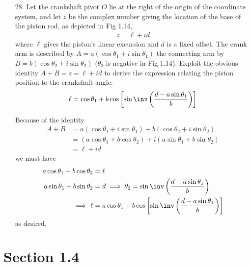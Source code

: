 \documentclass{article}
\begin{document}
\begin{itemize}
	\item[28.] Let the crankshaft pivot $O$ lie at the right of the origin of the coordinate system, and let $z$ be the complex number giving the location of the base of the piston rod, as depicted in Fig 1.14,
		\begin{align*}
			z=\ell+id
		\end{align*}
		where $\ell$ gives the piston's linear excursion and $d$ is a fixed offset. The crank arm is described by $A=a(\cos \theta_1+i\sin\theta_1)$ the connecting arm by $B=b(\cos\theta_2+i\sin\theta_2)$ ($\theta_2$ is negative in Fig 1.14). Exploit the obvious identity $A+B=z=\ell+id$ to derive the expression relating the piston position to the crankshaft angle:
		\begin{align*}
			\ell=\cos\theta_1+b\cos\left[ \sin\inv\left( \frac{d-a\sin\theta_1}{b} \right) \right]
		\end{align*}
		\begin{soln}
			Because of the identity
			\begin{align*}
				A+B &= a(\cos\theta_1+i\sin\theta_1)+b(\cos\theta_2+i\sin\theta_2) \\
				&= (a\cos \theta_1+b\cos\theta_2) + i(a\sin\theta_1+b\sin\theta_2) \\
				&= \ell+id
			\end{align*}
			we must have 
			\begin{align*}
				a\cos\theta_1+b\cos\theta_2 &= \ell \\
				a\sin\theta_1+b\sin\theta_2 &= d \implies \theta_2 = \sin\inv\left( \frac{d-a\sin\theta_1}{b} \right) \\
				\implies \ell &= a\cos \theta_1 + b\cos\left[ \sin\inv\left( \frac{d-a\sin\theta_1}{b} \right) \right]
			\end{align*}
			as desired.
		\end{soln}
		
\end{itemize}

\section*{Section 1.4}
\end{document}
